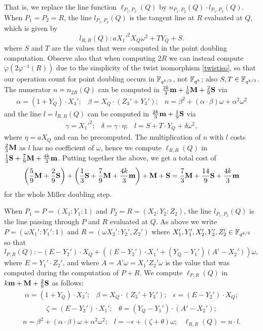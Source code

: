That is, we replace the line function $\ell_{P_1,P_2}(Q)$ by $n_{P_1,P_2}(Q) \cdot l_{P_1,P_2}(Q)$.
When $P_1 = P_2 = R$, the line $l_{P_1,P_2}(Q)$ is the tangent line at $R$ evaluated at $Q$, which is given by
\[l_{R,R}(Q): aX_1'^2 X_Q \omega^2 + T Y_Q + S.\]
where $S$ and $T$ are the values that were computed in the point doubling computation.
Observe also that when computing $2R$ we can instead compute
$\varphi(2\varphi^{-1}(R))$ due to the simplicity of the twist isomorphism \eqref{twistiso},
so that our operation count for point doubling occurs in $\mathbb{F}_{q^{k/3}}$, not $\mathbb{F}_{q^k}$; also $S,T \in \mathbb{F}_{q^{k/3}}$.
The numerator $n = n_{2R}(Q)$ can be computed in $\frac{2k}{3}\textbf{m} + \frac{1}{9}\textbf{M} + \frac{2}{9}\textbf{S}$ via
\[\begin{array}{ccc}
\alpha = (1+Y_Q)\cdot X_3';&
 \beta = X_Q\cdot (Z_3' + Y_3'); &
n = \beta^2 + (\alpha \cdot \beta) \omega + \alpha^2 \omega^2
\end{array}\]
and the line $l = l_{R,R}(Q)$ can be computed in $\frac{2k}{3}\textbf{m} + \frac{1}{9}\textbf{S}$ via
\[\begin{array}{ccc}
 \gamma = X_1'^2; &
 \delta = \gamma\cdot\eta; & 
 l = S + T\cdot Y_Q + \delta\omega^2,
\end{array}\]
where $\eta = aX_Q$ and can be precomputed.
The multiplication of $n$ with $l$ costs $\frac{2}{3}\textbf{M}$ as $l$ has no coefficient of $\omega$, hence we compute $\ell_{R,R}(Q)$ in 
$\frac{1}{3}\textbf{S} + \frac{7}{9}\textbf{M} + \frac{4k}{3}\textbf{m} $.
Putting together the above, we get a total cost of 
\[\left(\frac{5}{9}\textbf{M} + \frac{2}{9}\textbf{S}\right) + \left(\frac{1}{3}\textbf{S} + \frac{7}{9}\textbf{M} + \frac{4k}{3}\textbf{m} \right) + \textbf{M} + \textbf{S} = \frac{7}{3}\textbf{M} + \frac{14}{9}\textbf{S} + \frac{4k}{3}\textbf{m}\]
for the whole Miller doubling step.

When $P_1  = P = (X_1:Y_1:1)$ and $P_2 = R = (X_2:Y_2:Z_2)$, 
the line $l_{P_1,P_2}(Q)$ is the line passing through $P$ and $R$ evaluated at $Q$.
As above we write $P = (\omega X_1':Y_1':1)$ and 
$R = (\omega X_2': Y_2', Z_2')$ where $X_1',Y_1',X_2',Y_2',Z_2' \in \mathbb{F}_{q^{k/3}}$ 
so that
$$l_{P,R}(Q): - (E - Y_2') \cdot X_{Q} + ((E - Y_2') \cdot X_1' + (Y_{Q}-Y_1')(A'-X_2'))\omega, $$
where $E = Y_1' \cdot Z_2'$, and where $A = A'\omega = X_1'Z_2'\omega$ is the value that was computed during the computation of $P+R$.
We compute $\ell_{P,R}(Q)$ in
$k\textbf{m} + \textbf{M} + \frac{2}{9}\textbf{S}$
as follows:
\[\begin{array}{ccc}
\alpha = (1+Y_Q)\cdot X_3';&
 \beta = X_Q\cdot (Z_3' + Y_3'); &
 \epsilon = (E-Y_2')\cdot X_Q;
\end{array}\]
\[\begin{array}{cc}
 \zeta = (E-Y_2')\cdot X_1'; &
  \theta = (Y_Q-Y_1')\cdot(A'-X_2');
\end{array}\]
\[\begin{array}{ccc}
n = \beta^2 + (\alpha \cdot \beta) \omega + \alpha^2 \omega^2; &
l = -\epsilon + (\zeta+\theta)\omega; &
\ell_{R,R}(Q) = n\cdot l.
\end{array}\]

